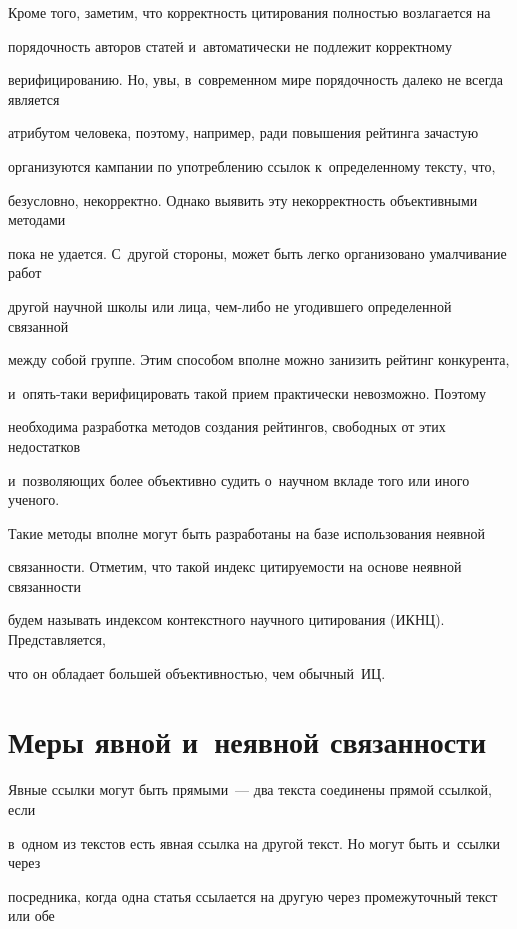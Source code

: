     

     Кроме того, заметим, что корректность цитирования полностью возлагается на 

порядочность авторов статей и~автоматически не подлежит корректному 

верифицированию. Но, увы, в~современном мире порядочность далеко не всегда является 

атрибутом человека, поэтому, например, ради повышения рейтинга зачастую 

организуются кампании по употреблению ссылок к~определенному тексту, что, 

безусловно, некорректно. Однако выявить эту некорректность объективными методами 

пока не удается. С~другой стороны, может быть легко организовано умалчивание работ 

другой научной школы или лица, чем-ли\-бо не угодившего определенной связанной 

между собой группе. Этим способом вполне можно занизить рейтинг конкурента, 

и~опять-та\-ки верифицировать такой прием практически невозможно. Поэтому 

необходима разработка методов создания рейтингов, свободных от этих недостатков 

и~позволяющих более объективно судить о~научном вкладе того или иного ученого. 

Такие методы вполне могут быть разработаны на базе использования неявной 

связанности. Отметим, что такой индекс цитируемости на основе неявной связанности 

будем называть индексом контекстного научного цитирования (ИКНЦ). Представляется, 

что он обладает большей объективностью, чем обычный~ИЦ.

     

\section{Меры явной и~неявной связанности}



     Явные ссылки могут быть прямыми~--- два текста соединены прямой ссылкой, если 

в~одном из текстов есть явная ссылка на другой текст. Но могут быть и~ссылки через 

посредника, когда одна статья ссылается на другую через промежуточный текст или обе 

